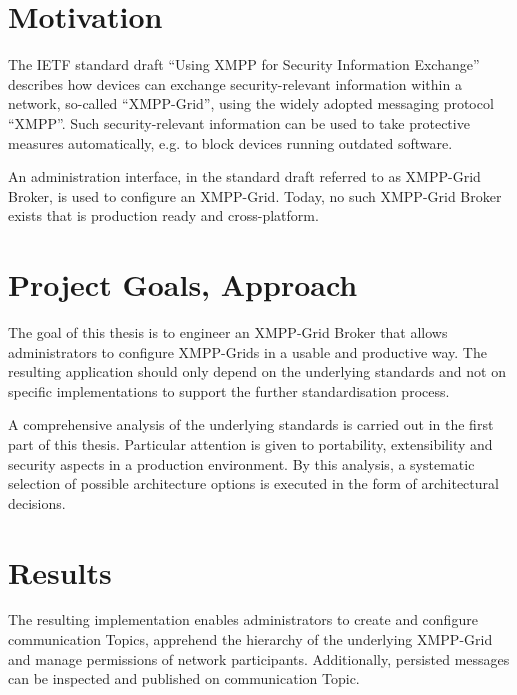 \section*{Motivation}
The IETF standard draft ``Using XMPP for Security Information Exchange'' describes how devices can exchange security-relevant information within a network, so-called ``XMPP-Grid'', using the widely adopted messaging protocol ``XMPP''.
Such security-relevant information can be used to take protective measures automatically, e.g. to block devices running outdated software.

An administration interface, in the standard draft referred to as XMPP-Grid Broker, is used to configure an XMPP-Grid.
Today, no such XMPP-Grid Broker exists that is production ready and cross-platform.

\section*{Project Goals, Approach}

The goal of this thesis is to engineer an XMPP-Grid Broker that allows administrators to configure XMPP-Grids in a usable and productive way.
The resulting application should only depend on the underlying standards and not on specific implementations to support the further standardisation process.

A comprehensive analysis of the underlying standards is carried out in the first part of this thesis.
Particular attention is given to portability, extensibility and security aspects in a production environment.
By this analysis, a systematic selection of possible architecture options is executed in the form of architectural decisions.

\section*{Results}

The resulting implementation enables administrators to create and configure communication Topics, apprehend the hierarchy of the underlying XMPP-Grid and manage permissions of network participants.
Additionally, persisted messages can be inspected and published on communication Topic.

